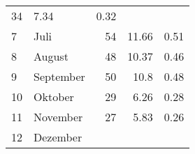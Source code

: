 \begin{longtable}{lXrrr}
       \num{34} &
       \num[round-mode=places,round-precision=2]{7,34} &
         \num[round-mode=places,round-precision=2]{0,32} \\

     7 &
     \multicolumn{1}{X}{ Juli   } &


       \num{54} &
       \num[round-mode=places,round-precision=2]{11,66} &
         \num[round-mode=places,round-precision=2]{0,51} \\

     8 &
     \multicolumn{1}{X}{ August   } &


       \num{48} &
       \num[round-mode=places,round-precision=2]{10,37} &
         \num[round-mode=places,round-precision=2]{0,46} \\

     9 &
     \multicolumn{1}{X}{ September   } &


       \num{50} &
       \num[round-mode=places,round-precision=2]{10,8} &
         \num[round-mode=places,round-precision=2]{0,48} \\

     10 &
     \multicolumn{1}{X}{ Oktober   } &


       \num{29} &
       \num[round-mode=places,round-precision=2]{6,26} &
         \num[round-mode=places,round-precision=2]{0,28} \\

     11 &
     \multicolumn{1}{X}{ November   } &


       \num{27} &
       \num[round-mode=places,round-precision=2]{5,83} &
         \num[round-mode=places,round-precision=2]{0,26} \\

     12 &
     \multicolumn{1}{X}{ Dezember   } &



\end{longtable}
